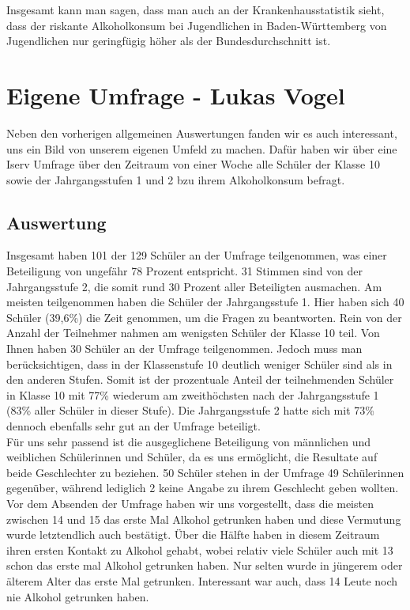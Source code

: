 \documentclass[12pt]{article}
\begin{document}
Insgesamt kann man sagen, dass man auch an der Krankenhausstatistik sieht, dass der riskante Alkoholkonsum bei Jugendlichen in Baden-Württemberg von Jugendlichen nur geringfügig höher als der Bundesdurchschnitt ist.

\section{Eigene Umfrage \footnotesize{- Lukas Vogel}}
Neben den vorherigen allgemeinen Auswertungen fanden wir es auch interessant, uns ein Bild von unserem eigenen Umfeld zu machen. Dafür haben wir über eine Iserv Umfrage über den Zeitraum von einer Woche alle Schüler der Klasse 10 sowie der Jahrgangsstufen 1 und 2 bzu ihrem Alkoholkonsum befragt.
\subsection{Auswertung}
Insgesamt haben 101 der 129 Schüler an der Umfrage teilgenommen, was einer Beteiligung von ungefähr 78 Prozent entspricht.
31 Stimmen sind von der Jahrgangsstufe 2, die somit rund 30 Prozent aller Beteiligten ausmachen. Am meisten teilgenommen haben die Schüler der Jahrgangsstufe 1. Hier haben sich 40 Schüler (39,6\%) die Zeit genommen, um die Fragen zu beantworten. Rein von der Anzahl der Teilnehmer nahmen am wenigsten Schüler der Klasse 10 teil. Von Ihnen haben 30 Schüler an der Umfrage teilgenommen. 
Jedoch muss man berücksichtigen, dass in der Klassenstufe 10 deutlich weniger Schüler sind als in den anderen Stufen. Somit ist der prozentuale Anteil der teilnehmenden Schüler in Klasse 10 mit 77\% wiederum am zweithöchsten nach der Jahrgangsstufe 1 (83\% aller Schüler in dieser Stufe). Die Jahrgangsstufe 2 hatte sich mit 73\% dennoch ebenfalls sehr gut an der Umfrage beteiligt.\\
Für uns sehr passend ist die ausgeglichene Beteiligung von männlichen und weiblichen Schülerinnen und Schüler, da es uns ermöglicht, die Resultate auf beide Geschlechter zu beziehen. 50 Schüler stehen in der Umfrage 49 Schülerinnen gegenüber, während lediglich 2 keine Angabe zu ihrem Geschlecht geben wollten. 
Vor dem Absenden der Umfrage haben wir uns vorgestellt, dass die meisten zwischen 14 und 15 das erste Mal Alkohol getrunken haben und diese Vermutung wurde letztendlich auch bestätigt. Über die Hälfte haben in diesem Zeitraum ihren ersten Kontakt zu Alkohol gehabt, wobei relativ viele Schüler auch mit 13 schon das erste mal Alkohol getrunken haben. Nur selten wurde in jüngerem oder älterem Alter das erste Mal getrunken. Interessant war auch, dass 14 Leute noch nie Alkohol getrunken haben. \\
\end{document}
